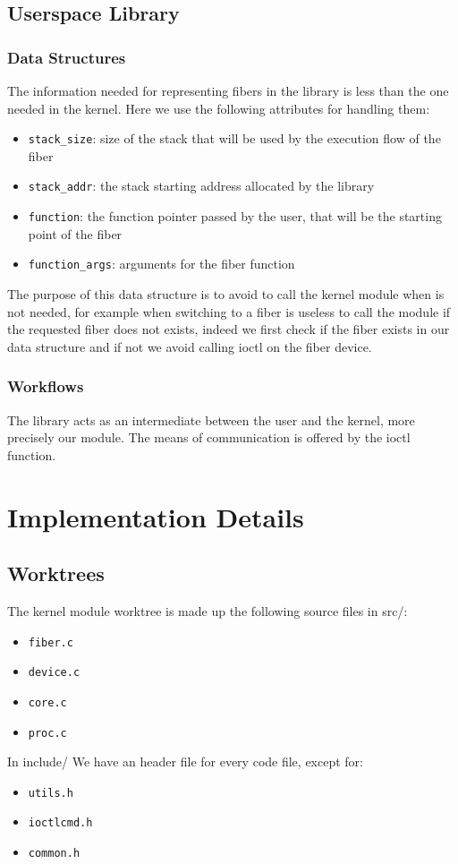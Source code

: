 \documentclass[a4paper,10pt]{article}
\begin{document}
\subsection{Userspace Library}

\subsubsection{Data Structures}
The information needed for representing fibers in the library is less than the one needed in the kernel. Here we use the following attributes for handling them:
\begin{itemize}
	\item \lstinline{stack_size}: size of the stack that will be used by the execution flow of the fiber
	\item \lstinline{stack_addr}: the stack starting address allocated by the library
	\item \lstinline[language={}]{function}: the function pointer passed by the user, that will be the starting point of the fiber
	\item \lstinline{function_args}: arguments for the fiber function
\end{itemize}

The purpose of this data structure is to avoid to call the kernel module when is not needed, for example when switching to a fiber is useless to call the module if the requested fiber does not exists, indeed we first check if the fiber exists in our data structure and if not we avoid calling ioctl on the fiber device.

\subsubsection{Workflows}
The library acts as an intermediate between the user and the kernel, more precisely our module. The means of communication is offered by the ioctl function.

\section{Implementation Details}
\subsection{Worktrees}
The kernel module worktree is made up the following source files in src/:
\begin{itemize}
	\item \lstinline{fiber.c}
	\item \lstinline{device.c}
	\item \lstinline{core.c}
	\item \lstinline{proc.c}
\end{itemize}
In include/ We have an header file for every code file, except for:
\begin{itemize}
	\item \lstinline{utils.h}
	\item \lstinline{ioctlcmd.h}
	\item \lstinline{common.h}
\end{itemize}
\end{document}
